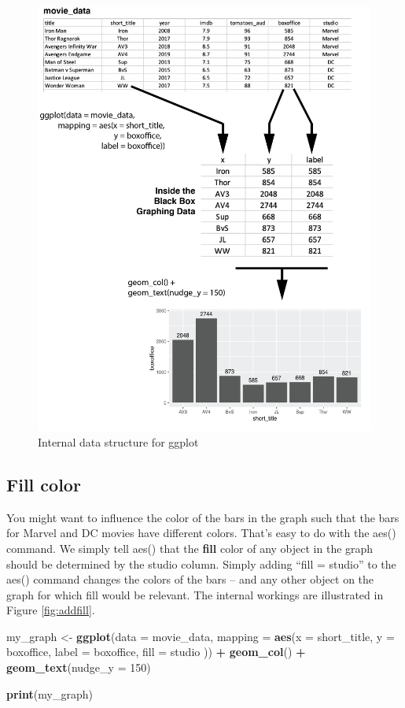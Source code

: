 \documentclass[
]{krantz}
\makeatletter
\newenvironment{Shaded}{\begin{snugshade}}{\end{snugshade}}
\newcommand{\DataTypeTok}[1]{\textcolor[rgb]{0.27,0.27,0.27}{#1}}
\newcommand{\DecValTok}[1]{\textcolor[rgb]{0.06,0.06,0.06}{#1}}
\newcommand{\KeywordTok}[1]{\textcolor[rgb]{0.27,0.27,0.27}{\textbf{#1}}}
\newcommand{\NormalTok}[1]{#1}
\newcommand{\OperatorTok}[1]{\textcolor[rgb]{0.43,0.43,0.43}{\textbf{#1}}}
\newcommand{\StringTok}[1]{\textcolor[rgb]{0.5,0.5,0.5}{#1}}
\newenvironment{kframe}{%
\medskip{}
\setlength{\fboxsep}{.8em}
 \def\at@end@of@kframe{}%
 \ifinner\ifhmode%
  \def\at@end@of@kframe{\end{minipage}}%
  \begin{minipage}{\columnwidth}%
 \fi\fi%
 \def\FrameCommand##1{\hskip\@totalleftmargin \hskip-\fboxsep
 \colorbox{shadecolor}{##1}\hskip-\fboxsep
     \hskip-\linewidth \hskip-\@totalleftmargin \hskip\columnwidth}%
 \MakeFramed {\advance\hsize-\width
   \@totalleftmargin\z@ \linewidth\hsize
   \@setminipage}}%
 {\par\unskip\endMakeFramed%
 \at@end@of@kframe}
\renewenvironment{Shaded}{\begin{kframe}}{\end{kframe}}
\makeatother
\begin{document}
\begin{figure}
\includegraphics[width=0.7\linewidth]{ch_graphing/images/mapping} \caption{Internal data structure for ggplot}\label{fig:showmap}
\end{figure}

\hypertarget{fill-color}{%
\subsection{Fill color}\label{fill-color}}

You might want to influence the color of the bars in the graph such that the bars for Marvel and DC movies have different colors. That's easy to do with the aes() command. We simply tell aes() that the \textbf{fill} color of any object in the graph should be determined by the studio column. Simply adding ``fill = studio'' to the aes() command changes the colors of the bars -- and any other object on the graph for which fill would be relevant. The internal workings are illustrated in Figure \ref{fig:addfill}.

\begin{Shaded}
\begin{Highlighting}[]
\NormalTok{my_graph <-}\StringTok{ }\KeywordTok{ggplot}\NormalTok{(}\DataTypeTok{data =}\NormalTok{ movie_data,}
           \DataTypeTok{mapping =} \KeywordTok{aes}\NormalTok{(}\DataTypeTok{x =}\NormalTok{ short_title,}
                         \DataTypeTok{y =}\NormalTok{ boxoffice,}
                         \DataTypeTok{label =}\NormalTok{ boxoffice,}
                         \DataTypeTok{fill =}\NormalTok{ studio )) }\OperatorTok{+}
\StringTok{  }\KeywordTok{geom_col}\NormalTok{() }\OperatorTok{+}
\StringTok{  }\KeywordTok{geom_text}\NormalTok{(}\DataTypeTok{nudge_y =} \DecValTok{150}\NormalTok{) }

\KeywordTok{print}\NormalTok{(my_graph)}
\end{Highlighting}
\end{Shaded}
\end{document}
